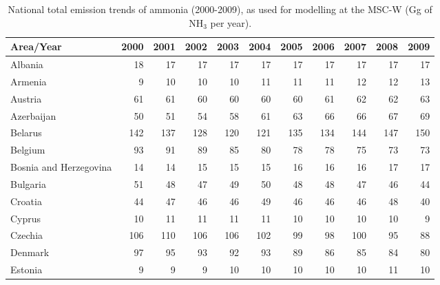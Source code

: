  \begin{table}
 \caption{National total emission trends of  ammonia (2000-2009), as used for modelling at the MSC-W (Gg of NH$_3$ per year).}
 
 \vspace{15pt}
 
 \scriptsize
 \centering
 \begin{tabular}{|l|r|r|r|r|r|r|r|r|r|r|}
 \hline
                     Area/Year&   2000&   2001&   2002&   2003&   2004&   2005&   2006&   2007&   2008&   2009\\\hline\hline
                       Albania&     18&     17&     17&     17&     17&     17&     17&     17&     17&     17\\\hline
                       Armenia&      9&     10&     10&     10&     11&     11&     11&     12&     12&     13\\\hline
                       Austria&     61&     61&     60&     60&     60&     60&     61&     62&     62&     63\\\hline
                    Azerbaijan&     50&     51&     54&     58&     61&     63&     66&     66&     67&     69\\\hline
                       Belarus&    142&    137&    128&    120&    121&    135&    134&    144&    147&    150\\\hline
                       Belgium&     93&     91&     89&     85&     80&     78&     78&     75&     73&     73\\\hline
        Bosnia and Herzegovina&     14&     14&     15&     15&     15&     16&     16&     16&     17&     17\\\hline
                      Bulgaria&     51&     48&     47&     49&     50&     48&     48&     47&     46&     44\\\hline
                       Croatia&     44&     47&     46&     46&     49&     46&     46&     46&     48&     40\\\hline
                        Cyprus&     10&     11&     11&     11&     11&     10&     10&     10&     10&      9\\\hline
                       Czechia&    106&    110&    106&    106&    102&     99&     98&    100&     95&     88\\\hline
                       Denmark&     97&     95&     93&     92&     93&     89&     86&     85&     84&     80\\\hline
                       Estonia&      9&      9&      9&     10&     10&     10&     10&     10&     11&     10\\\hline

\end{tabular}
\end{table}
